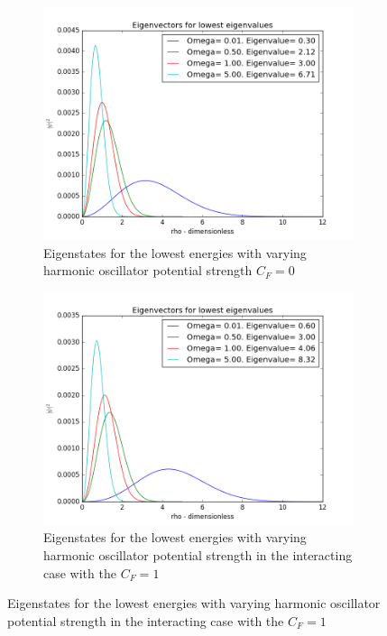 \documentclass[a4paper,11pt]{article}
\begin{document}
{\begin{figure}
	\centering
	\begin{subfigure}[b]{0.4\textwidth}
		\includegraphics[scale=0.4]{ok_Project_2_Wr=varying_omega}
		\caption{Eigenstates for the lowest energies with varying harmonic oscillator potential strength $C_F = 0$}
		\label{fig:varyingomega}
	\end{subfigure}
	\begin{subfigure}[b]{0.4\textwidth}
		\includegraphics[scale=0.4]{ok_Project_2_Wr=_interaction_varying_omega}
		\caption{Eigenstates for the lowest energies with varying harmonic oscillator potential strength in the interacting case with the $C_F = 1$}
		\label{fig:varyingomegainteracting}
	\end{subfigure}


\end{figure}}
\end{document}
